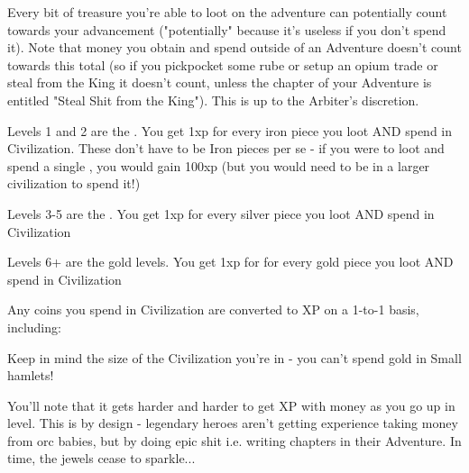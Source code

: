 {


Every bit of treasure you're able to loot on the adventure can potentially count towards your advancement ("potentially" because it's useless if you don't spend it).  Note that money you obtain and spend outside of an Adventure doesn't count towards this total (so if you pickpocket some rube or setup an opium trade or steal from the King it doesn't count, unless the chapter of your Adventure is entitled "Steal Shit from the King").  This is up to the Arbiter's discretion.

Levels 1 and 2 are the .  You get 1xp for every iron piece you loot AND spend in Civilization.  These don't have to be Iron pieces per se -  if you were to loot and spend a single \AU, you would gain 100xp (but you would need to be in a larger civilization to spend it!)

Levels 3-5 are the .  You get 1xp for every silver piece you loot AND spend in Civilization 

Levels 6+ are the gold levels.  You get 1xp for for every gold piece you loot AND spend in Civilization


Any coins you spend in Civilization are converted to XP on a 1-to-1 basis, including:


Keep in mind the size of the Civilization you're in - you can't spend gold in Small hamlets!

You'll note that it gets harder and harder to get XP with money as you go up in level.  This is by design - legendary heroes aren't getting experience taking money from orc babies, but by doing epic shit i.e. writing chapters in their Adventure.  In time, the jewels cease to sparkle...


}
